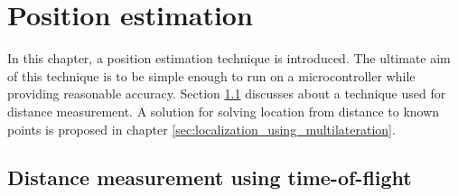 \documentclass[\main/main.tex]{subfiles}
\begin{document}
\graphicspath{{img/}{position_estimation/img/}}
\chapter{Position estimation}

In this chapter, a position estimation technique is introduced. The ultimate aim of this technique is to be simple enough to run on a microcontroller while providing reasonable accuracy. Section \ref{sec:distance_measurement_using_time_of_flight} discusses about a technique used for distance measurement. A solution for solving location from distance to known points is proposed in chapter \ref{sec:localization_using_multilateration}.

\section{Distance measurement using time-of-flight}
\label{sec:distance_measurement_using_time_of_flight}
\end{document}
